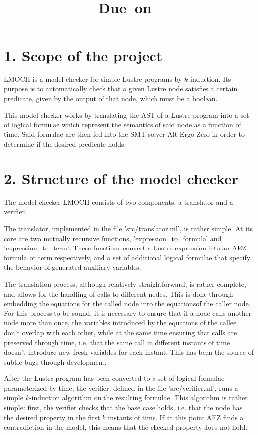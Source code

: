 \documentclass[11pt]{article}
\title{
\textmd{\textbf{\hmwkTitle}}\\
\normalsize\vspace{0.1in}\small{Due\ on\ \hmwkDueDate}\\
}
\author{\textbf{\hmwkAuthorName}}
\begin{document}
\maketitle

\section{1. Scope of the project}
LMOCH is a model checker for simple Lustre programs by $k$-induction. Its purpose is to automatically
check that a given Lustre node satisfies a certain predicate, given by the output of that node, which
must be a boolean.

This model checker works by translating the AST of a Lustre program into a set of
logical formulae which represent the semantics of said node as a function of time. Said formulae are
then fed into the SMT solver Alt-Ergo-Zero in order to determine if the desired predicate holds.

\section{2. Structure of the model checker}
The model checker LMOCH consists of two components: a translator and a verifier.

The translator, implemented in the file 'src/translator.ml', is rather simple. At its core are two mutually
recursive functions, 'expression\_to\_formula' and 'expression\_to\_term'. These functions convert a Lustre
expression into an AEZ formula or term respectively, and a set of additional logical formulae that specify
the behavior of generated auxiliary variables.

The translation process, although relatively straightforward, is rather complete, and allows for the handling
of calls to different nodes. This is done through embedding the equations for the called node into the 
equationsof the caller node. For this process to be sound, it is necessary to ensure that if a node calls
another
node more than once, the variables introduced by the equations of the callee don't overlap with each other,
while at the same time ensuring that calls are preserved through time, i.e. that the same call in different
instants of time doesn't introduce new fresh variables for each instant. This has been the source of subtle bugs
through development.

After the Lustre program has been converted to a set of logical formulae parameterized by time, the verifier,
defined in the file 'src/verifier.ml', runs a simple $k$-induction algorithm on the resulting formulae. This
algorithm is rather simple: first, the verifier checks that the base case holds, i.e. that the node has the
desired property in the first $k$ instants of time. If at this point AEZ finds a contradiction in the model,
this means that the checked property does not hold.
\end{document}
